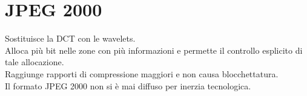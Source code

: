 \documentclass{report}
\begin{document}
	\section{JPEG 2000}
	Sostituisce la DCT con le wavelets.\\
	Alloca più bit nelle zone con più informazioni e permette il controllo esplicito di tale allocazione.\\
	Raggiunge rapporti di compressione maggiori e non causa blocchettatura.\\
	Il formato JPEG 2000 non si è mai diffuso per inerzia tecnologica.

\end{document}
